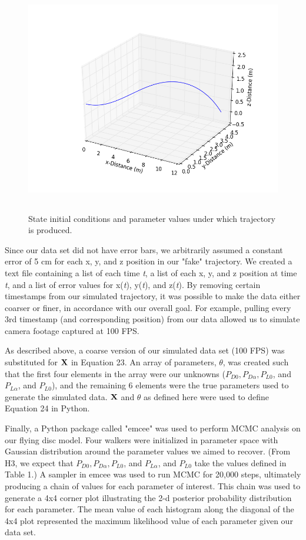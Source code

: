 \documentclass[a4paper,12pt, oneside]{article}
\begin{document}
\begin{figure}[H]
	\centering
	\includegraphics[width=16cm, height=10cm]{Simulated_throw_graph}
	\caption{\color{red}State initial conditions and parameter values under which trajectory is produced.\color{black}}
\end{figure}

Since our data set did not have error bars, we arbitrarily assumed a constant error of 5 cm for each x, y, and z position in our "fake" trajectory. We created a text file containing a list of each time \textit{t}, a list of each x, y, and z position at time \textit{t}, and a list of error values for x(\textit{t}), y(\textit{t}), and z(\textit{t}). By removing certain timestamps from our simulated trajectory, it was possible to make the data either coarser or finer, in accordance with our overall goal. For example, pulling every 3rd timestamp (and corresponding position) from our data  allowed us to simulate camera footage captured at 100 FPS.

As described above, a coarse version of our simulated data set (100 FPS) was substituted for $\bold{X}$ in Equation 23. An array of parameters, $\theta$, was created such that the first four elements in the array were our unknowns ($P_{D0}, P_{D\alpha}, P_{L0}$, and $P_{L\alpha}$, and $P_{L0}$), and the remaining 6 elements were the true parameters used to generate the simulated data. $\bold{X}$ and $\theta$ as defined here were used to define Equation 24 in Python.

Finally, a Python package called "emcee" was used to perform MCMC analysis on our flying disc model. Four walkers were initialized in parameter space with Gaussian distribution around the parameter values we aimed to recover. (From H3, we expect that $P_{D0}, P_{D\alpha}, P_{L0}$, and $P_{L\alpha}$, and $P_{L0}$ take the values defined in Table 1.) A sampler in emcee was used to run MCMC for 20,000 steps, ultimately producing a chain of values for each parameter of interest.  This chain was used to generate a 4x4 corner plot illustrating the 2-d posterior probability distribution for each parameter. The mean value of each histogram along the diagonal of the 4x4 plot represented the maximum likelihood value of each parameter given our data set.
\end{document}
